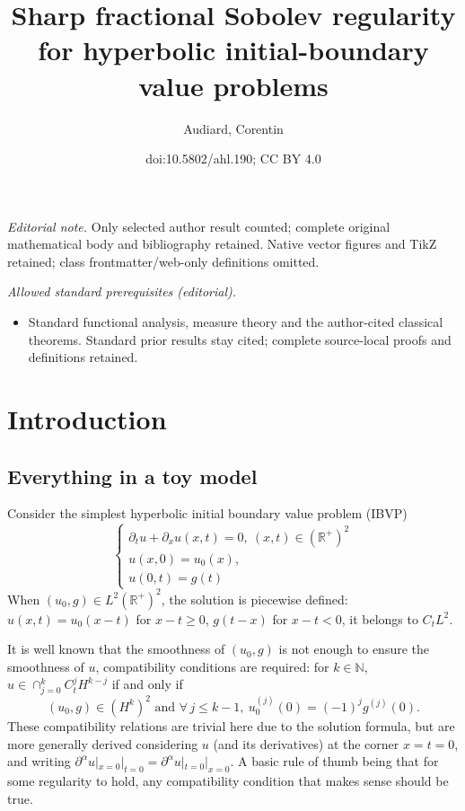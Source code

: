 \documentclass[10pt]{amsart}
\title{Sharp fractional Sobolev regularity for hyperbolic initial-boundary value problems}
\author{Audiard, Corentin}
\date{doi:10.5802/ahl.190; CC BY 4.0}
\theoremstyle{definition}\newtheorem{defi}[theo]{Definition}\newtheorem{rema}[theo]{Remark}\newtheorem{exam}[theo]{Example}\newtheorem{exem}[theo]{Example}\newtheorem{nota}[theo]{Notation}
\newcommand{\R}{\mathbb{R}}
\newcommand{\N}{\mathbb{N}}
\let\oldforall\forall
\renewcommand*{\forall}{\mathrel{\oldforall}}
\begin{document}
\maketitle
\noindent\textit{Editorial note.} Only selected author result counted; complete original mathematical body and bibliography retained. Native vector figures and TikZ retained; class frontmatter/web-only definitions omitted.\par\medskip
\noindent\textit{Allowed standard prerequisites (editorial).}\begin{itemize}
\item Standard functional analysis, measure theory and the author-cited classical theorems. Standard prior results stay cited; complete source-local proofs and definitions retained.
\end{itemize}\medskip

\section{Introduction}

\subsection{Everything in a toy model}
Consider the simplest hyperbolic initial boundary value problem (IBVP)
\[
\begin{cases}
\partial_tu+\partial_xu(x,t)=0,\ (x,t)\in (\R^+)^2\\
u(x,0)=u_0(x),\\
u(0,t)=g(t)
\end{cases}
\]
When $(u_0,g)\in L^2(\R^+)^2$, the solution is piecewise defined: $u(x,t)=u_0(x-t)$ for $x-t\geq 0$, $g(t-x)$ for $x-t< 0$, it belongs to $C_tL^2$. 


It is well known that the smoothness of $(u_0,g)$ is not enough to ensure the smoothness of $u$, compatibility conditions are required: for $k\in \N$, $u\in \cap_{j=0}^kC_t^jH^{k-j}$ if and only if
\[
(u_0,g)\in \left(H^k\right)^2\text{ and }\forall\,j\leq k-1,\ u_0^{(j)}(0)=(-1)^jg^{(j)}(0).
\]
These compatibility relations are trivial here due to the solution formula, but are more generally derived considering $u$ (and its derivatives) at the corner $x=t=0$, and writing $\partial^\alpha u|_{x=0}|_{t=0}=\partial^\alpha u|_{t=0}|_{x=0}$. A basic rule of thumb being that for some regularity to hold, any compatibility condition that makes sense should be true.
\end{document}
